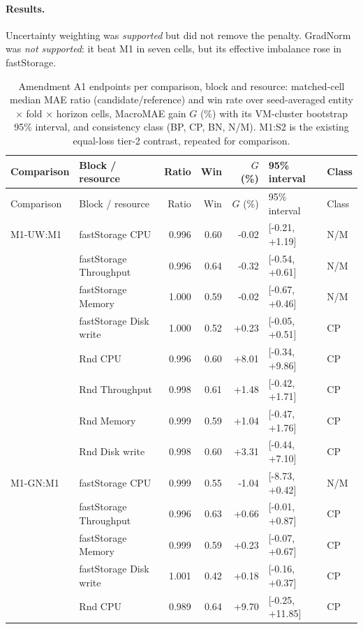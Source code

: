 \documentclass[a4paper,11pt]{article}
\begin{document}
\paragraph{Results.} Uncertainty weighting was \emph{supported} but did not remove the penalty. GradNorm was
\emph{not supported}: it beat M1 in seven cells, but its effective imbalance rose in fastStorage.

\begin{longtable}{@{}llrrrll@{}}
\caption{Amendment A1 endpoints per comparison, block and resource: matched-cell median MAE ratio (candidate/reference) and win rate over seed-averaged entity $\times$ fold $\times$ horizon cells, MacroMAE gain $G$ (\%) with its VM-cluster bootstrap 95\% interval, and consistency class (BP, CP, BN, N/M). M1:S2 is the existing equal-loss tier-2 contrast, repeated for comparison.}\label{tab:a1-endpoints}\\
\toprule
Comparison & Block / resource & Ratio & Win & $G$ (\%) & 95\% interval & Class \\
\midrule
\endfirsthead
\toprule
Comparison & Block / resource & Ratio & Win & $G$ (\%) & 95\% interval & Class \\
\midrule
\endhead
M1-UW:M1 & fastStorage CPU & 0.996 & 0.60 & -0.02 & [-0.21, +1.19] & N/M \\
 & fastStorage Throughput & 0.996 & 0.64 & -0.32 & [-0.54, +0.61] & N/M \\
 & fastStorage Memory & 1.000 & 0.59 & -0.02 & [-0.67, +0.46] & N/M \\
 & fastStorage Disk write & 1.000 & 0.52 & +0.23 & [-0.05, +0.51] & CP \\
 & Rnd CPU & 0.996 & 0.60 & +8.01 & [-0.34, +9.86] & CP \\
 & Rnd Throughput & 0.998 & 0.61 & +1.48 & [-0.42, +1.71] & CP \\
 & Rnd Memory & 0.999 & 0.59 & +1.04 & [-0.47, +1.76] & CP \\
 & Rnd Disk write & 0.998 & 0.60 & +3.31 & [-0.44, +7.10] & CP \\
\addlinespace
M1-GN:M1 & fastStorage CPU & 0.999 & 0.55 & -1.04 & [-8.73, +0.42] & N/M \\
 & fastStorage Throughput & 0.996 & 0.63 & +0.66 & [-0.01, +0.87] & CP \\
 & fastStorage Memory & 0.999 & 0.59 & +0.23 & [-0.07, +0.67] & CP \\
 & fastStorage Disk write & 1.001 & 0.42 & +0.18 & [-0.16, +0.37] & CP \\
 & Rnd CPU & 0.989 & 0.64 & +9.70 & [-0.25, +11.85] & CP \\

\end{longtable}
\end{document}
